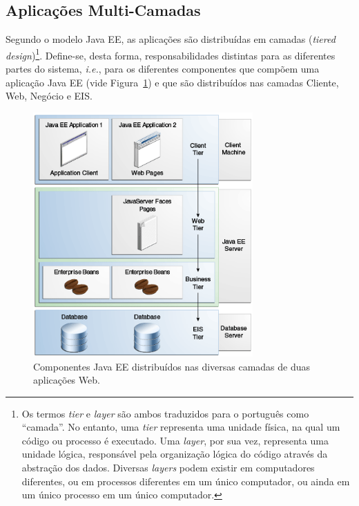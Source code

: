 \documentclass[
  10.5pt,				  %
	openright,			%
	twoside,			  %
  a5paper,
  chapter=TITLE,	%
	section=TITLE,	%
  hyphens,        %
	english,        %
	brazil          %
]{abntex2}
\begin{document}
\subsection{Aplicações Multi-Camadas}

Segundo o modelo Java EE, as aplicações são distribuídas em camadas (\emph{tiered design})\footnote{Os termos \emph{tier} e \emph{layer} são ambos traduzidos para o português como ``camada''. No entanto, uma \emph{tier} representa uma unidade física, na qual um código ou processo é executado. Uma \emph{layer}, por sua vez, representa uma unidade lógica, responsável pela organização lógica do código através da abstração dos dados. Diversas \emph{layers} podem existir em computadores diferentes, ou em processos diferentes em um único computador, ou ainda em um único processo em um único computador.\cite{lhotka}}. Define-se, desta forma, responsabilidades distintas para as diferentes partes do sistema, \emph{i.e.}, para os diferentes componentes que compõem uma aplicação Java EE (vide Figura~\ref{fig:multitiered_app}) e que são distribuídos nas camadas Cliente, Web, Negócio e EIS.

\begin{figure}[!ht]
  \caption{\label{fig:multitiered_app}Componentes Java EE distribuídos nas diversas camadas de duas aplicações Web.}
  \begin{center}
    \includegraphics[width=0.75\textwidth]{multitiered_applications.png}
  \end{center}
\end{figure}
\end{document}
